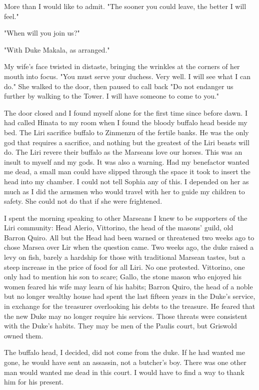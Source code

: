 \documentclass{article}
\begin{document}
More than I would like to admit. "The sooner you could leave, the better I will feel."

"When will you join us?"
 
"With Duke Makala, as arranged."

My wife's face twisted in distaste, bringing the wrinkles at the corners of her mouth into focus. "You must serve your duchess. Very well. I will see what I can do." She walked to the door, then paused to call back "Do not endanger us further by walking to the Tower. I will have someone to come to you."

The door closed and I found myself alone for the first time since before dawn. I had called Hinata to my room when I found the bloody buffalo head beside my bed. The Liri sacrifice buffalo to Zinmenzu of the fertile banks. He was the only god that requires a sacrifice, and nothing but the greatest of the Liri beasts will do. The Liri revere their buffalo as the Marseans love our horses. This was an insult to myself and my gods. It was also a warning. Had my benefactor wanted me dead, a small man could have slipped through the space it took to insert the head into my chamber. I could not tell Sophia any of this. I depended on her as much as I did the armsmen who would travel with her to guide my children to safety. She could not do that if she were frightened.

I spent the morning speaking to other Marseans I knew to be supporters of the Liri community: Head Alerio, Vittorino, the head of the masons' guild, old Barron Quiro. All but the Head had been warned or threatened two weeks ago to chose Marsea over Lir when the question came. Two weeks ago, the duke raised a levy on fish, barely a hardship for those with traditional Marsean tastes, but a steep increase in the price of food for all Liri. No one protested. Vittorino, one only had to mention his son to scare; Gallo, the stone mason who enjoyed his women feared his wife may learn of his habits; Barron Quiro, the head of a noble but no longer wealthy house had spent the last fifteen years in the Duke's service, in exchange for the treasurer overlooking his debts to the treasure. He feared that the new Duke may no longer require his services. Those threats were consistent with the Duke's habits. They may be men of the Paulis court, but Griswold owned them. 

The buffalo head, I decided, did not come from the duke. If he had wanted me gone, he would have sent an assassin, not a butcher's boy. There was one other man would wanted me dead in this court. I would have to find a way to thank him for his present.
\end{document}
